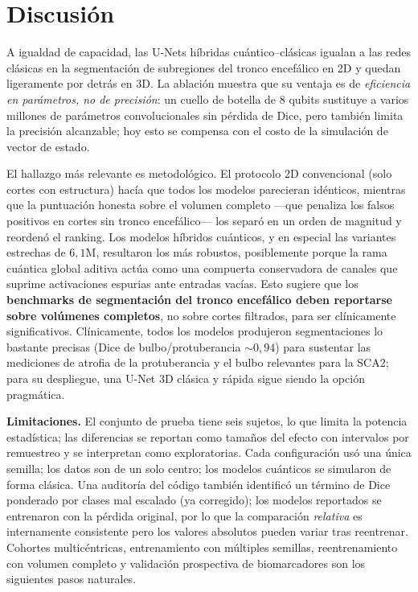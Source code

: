 \documentclass[runningheads]{llncs}
\begin{document}
\section{Discusión}
A igualdad de capacidad, las U-Nets híbridas cuántico--clásicas igualan a las
redes clásicas en la segmentación de subregiones del tronco encefálico en 2D y
quedan ligeramente por detrás en 3D. La ablación muestra que su ventaja es de
\emph{eficiencia en parámetros, no de precisión}: un cuello de botella de $8$
qubits sustituye a varios millones de parámetros convolucionales sin pérdida de
Dice, pero también limita la precisión alcanzable; hoy esto se compensa con el
costo de la simulación de vector de estado.

El hallazgo más relevante es metodológico. El protocolo 2D convencional
(solo cortes con estructura) hacía que todos los modelos parecieran idénticos,
mientras que la puntuación honesta sobre el volumen completo ---que penaliza los
falsos positivos en cortes sin tronco encefálico--- los separó en un orden de
magnitud y reordenó el ranking. Los modelos híbridos cuánticos, y en especial
las variantes estrechas de $6{,}1$M, resultaron los más robustos, posiblemente
porque la rama cuántica global aditiva actúa como una compuerta conservadora de
canales que suprime activaciones espurias ante entradas vacías. Esto sugiere que
los \textbf{benchmarks de segmentación del tronco encefálico deben reportarse
sobre volúmenes completos}, no sobre cortes filtrados, para ser clínicamente
significativos. Clínicamente, todos los modelos produjeron segmentaciones lo
bastante precisas (Dice de bulbo/protuberancia ${\sim}0{,}94$) para sustentar
las mediciones de atrofia de la protuberancia y el bulbo relevantes para la
SCA2; para su despliegue, una U-Net 3D clásica y rápida sigue siendo la opción
pragmática.

\noindent\textbf{Limitaciones.} El conjunto de prueba tiene seis sujetos, lo que
limita la potencia estadística; las diferencias se reportan como tamaños del
efecto con intervalos por remuestreo y se interpretan como exploratorias. Cada
configuración usó una única semilla; los datos son de un solo centro; los
modelos cuánticos se simularon de forma clásica. Una auditoría del código también
identificó un término de Dice ponderado por clases mal escalado (ya corregido);
los modelos reportados se entrenaron con la pérdida original, por lo que la
comparación \emph{relativa} es internamente consistente pero los valores
absolutos pueden variar tras reentrenar. Cohortes multicéntricas, entrenamiento
con múltiples semillas, reentrenamiento con volumen completo y validación
prospectiva de biomarcadores son los siguientes pasos naturales.
\end{document}
